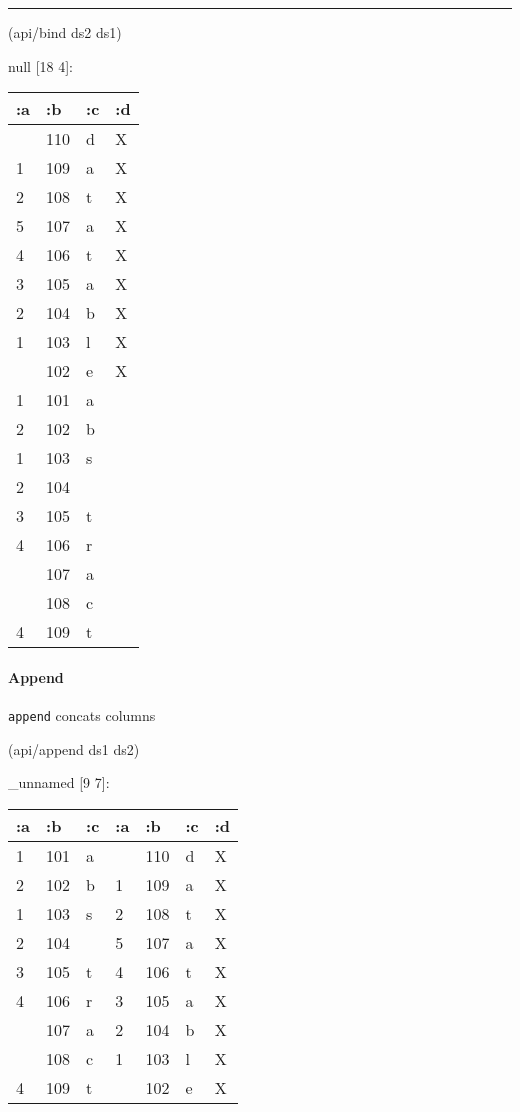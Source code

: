 \documentclass[]{article}
\newenvironment{Shaded}{\begin{snugshade}}{\end{snugshade}}
\newcommand{\NormalTok}[1]{#1}
\let\oldparagraph\paragraph
\renewcommand{\paragraph}[1]{\oldparagraph{#1}\mbox{}}
\begin{document}
\begin{center}\rule{0.5\linewidth}{0.5pt}\end{center}

\begin{Shaded}
\begin{Highlighting}[]
\NormalTok{(api/bind ds2 ds1)}
\end{Highlighting}
\end{Shaded}

null {[}18 4{]}:

\begin{longtable}[]{@{}llll@{}}
\toprule
:a & :b & :c & :d\tabularnewline
\midrule
\endhead
& 110 & d & X\tabularnewline
1 & 109 & a & X\tabularnewline
2 & 108 & t & X\tabularnewline
5 & 107 & a & X\tabularnewline
4 & 106 & t & X\tabularnewline
3 & 105 & a & X\tabularnewline
2 & 104 & b & X\tabularnewline
1 & 103 & l & X\tabularnewline
& 102 & e & X\tabularnewline
1 & 101 & a &\tabularnewline
2 & 102 & b &\tabularnewline
1 & 103 & s &\tabularnewline
2 & 104 & &\tabularnewline
3 & 105 & t &\tabularnewline
4 & 106 & r &\tabularnewline
& 107 & a &\tabularnewline
& 108 & c &\tabularnewline
4 & 109 & t &\tabularnewline
\bottomrule
\end{longtable}

\hypertarget{append}{%
\paragraph{Append}\label{append}}

\texttt{append} concats columns

\begin{Shaded}
\begin{Highlighting}[]
\NormalTok{(api/append ds1 ds2)}
\end{Highlighting}
\end{Shaded}

\_unnamed {[}9 7{]}:

\begin{longtable}[]{@{}lllllll@{}}
\toprule
:a & :b & :c & :a & :b & :c & :d\tabularnewline
\midrule
\endhead
1 & 101 & a & & 110 & d & X\tabularnewline
2 & 102 & b & 1 & 109 & a & X\tabularnewline
1 & 103 & s & 2 & 108 & t & X\tabularnewline
2 & 104 & & 5 & 107 & a & X\tabularnewline
3 & 105 & t & 4 & 106 & t & X\tabularnewline
4 & 106 & r & 3 & 105 & a & X\tabularnewline
& 107 & a & 2 & 104 & b & X\tabularnewline
& 108 & c & 1 & 103 & l & X\tabularnewline
4 & 109 & t & & 102 & e & X\tabularnewline
\bottomrule
\end{longtable}
\end{document}
